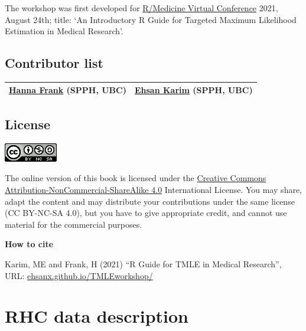 \documentclass[
]{book}
\begin{document}
The workshop was first developed for \href{https://r-medicine.org/schedule/}{R/Medicine
Virtual Conference} 2021, August 24th; title: `An Introductory R Guide for Targeted Maximum Likelihood Estimation in Medical Research'.

\hypertarget{contributor-list}{%
\section*{Contributor list}\label{contributor-list}}

\begin{longtable}[]{@{}ll@{}}
\toprule
\endhead
\href{https://www.linkedin.com/in/hanna-f-940813b9/}{Hanna Frank} (SPPH, UBC) & \href{https://ehsank.com/}{Ehsan Karim} (SPPH, UBC)\tabularnewline
\bottomrule
\end{longtable}

\hypertarget{license}{%
\section*{License}\label{license}}

\includegraphics[width=0.25\linewidth]{images/by-nc-sa}

The online version of this book is licensed under the \href{https://creativecommons.org/licenses/by-nc-sa/4.0/}{Creative Commons Attribution-NonCommercial-ShareAlike 4.0} International License. You may share, adapt the content and may distribute your contributions under the same license (CC BY-NC-SA 4.0), but you have to give appropriate credit, and cannot use material for the commercial purposes.

\begin{rmdcomment}
\textbf{How to cite}

Karim, ME and Frank, H (2021) ``R Guide for TMLE in Medical Research'',
URL:
\href{https://ehsanx.github.io/TMLEworkshop/}{ehsanx.github.io/TMLEworkshop/}
\end{rmdcomment}

\hypertarget{rhc-data-description}{%
\chapter{RHC data description}\label{rhc-data-description}}
\end{document}
